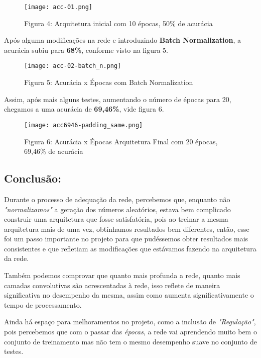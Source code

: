 \begin{figure}[ht]
\centering
\texttt{[image: acc-01.png]}
\caption{Figura 4: Arquitetura inicial com 10 épocas, 50\% de acurácia}
\end{figure}

Após alguma modificações na rede e introduzindo \textbf{Batch Normalization}, a acurácia subiu para
\textbf{68\%}, conforme visto na figura 5.

\begin{figure}[ht]
\centering
\texttt{[image: acc-02-batch\_n.png]}
\caption{Figura 5: Acurácia x Épocas com Batch Normalization}
\end{figure}


Assim, após mais alguns testes, aumentando o número de épocas para 20,
chegamos a uma acurácia de \textbf{69,46\%}, vide figura 6.

\begin{figure}[H]
\centering
\texttt{[image: acc6946-padding\_same.png]}
\caption{Figura 6: Acurácia x Épocas Arquitetura Final com 20 épocas, 69,46\% de acurácia}
\end{figure}


    \subsection{Conclusão:}\label{conclusao}

Durante o processo de adequação da rede, percebemos que, enquanto não \emph{"normalizamos"}
a geração dos números aleatórios, estava bem complicado construir uma arquitetura
que fosse satisfatória, pois ao treinar a mesma arquitetura mais de uma vez, obtínhamos
resultados bem diferentes, então, esse foi um passo importante no projeto para que
pudéssemos obter resultados mais consistentes e que refletiam as modificações que
estávamos fazendo na arquitetura da rede.

Também podemos comprovar que quanto mais profunda a rede, quanto mais camadas convolutivas
são acrescentadas à rede, isso reflete de maneira significativa no desempenho da mesma,
assim como aumenta significativamente o tempo de processamento.

Ainda há espaço para melhoramentos no projeto, como a inclusão de \emph{"Regulação"}, pois
percebemos que com o passar das \emph{épocas}, a rede vai aprendendo muito bem o conjunto
de treinamento mas não tem o mesmo desempenho suave no conjunto de testes.


